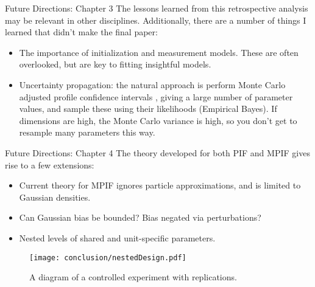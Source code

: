 \documentclass[aspectratio=169]{beamer}\usepackage[]{graphicx}\usepackage[]{xcolor}
\makeatletter
\def\maxwidth{ %
  \ifdim\Gin@nat@width>\linewidth
    \linewidth
  \else
    \Gin@nat@width
  \fi
}
\makeatother
\begin{document}
  \begin{frame}{Future Directions: Chapter 3}
    The lessons learned from this retrospective analysis may be relevant in other disciplines.
    Additionally, there are a number of things I learned that didn't make the final paper: 
    \begin{itemize}
      \item The importance of initialization and measurement models. These are often overlooked, but are key to fitting insightful models.
      \item Uncertainty propagation: the natural approach is perform Monte Carlo adjusted profile confidence intervals \citep{ionides17}, giving a large number of parameter values, and sample these using their likelihoods (Empirical Bayes). If dimensions are high, the Monte Carlo variance is high, so you don't get to resample many parameters this way. 
    \end{itemize}
  \end{frame}
  
  \begin{frame}{Future Directions: Chapter 4}
    The theory developed for both PIF and MPIF gives rise to a few extensions: 
    \begin{itemize}
      \item Current theory for MPIF ignores particle approximations, and is limited to Gaussian densities.
      \item Can Gaussian bias be bounded? Bias negated via perturbations?
      \item Nested levels of shared and unit-specific parameters. 
    \end{itemize}
    
    \begin{figure}[h!]
    \centering
    \texttt{[image: conclusion/nestedDesign.pdf]}
    \caption[A diagram of a controlled experiment with replications.]{A diagram of a controlled experiment with replications.}
    \label{fig:controlled_experiment}
\end{figure}
  \end{frame}
    
\end{document}
